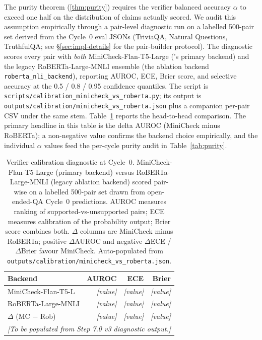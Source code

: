 The purity theorem (\cref{thm:purity}) requires the verifier balanced
accuracy $\alpha$ to exceed one half on the distribution of claims
actually scored. We audit this assumption empirically through a
pair-level diagnostic run on a labelled 500-pair set derived from the
Cycle~0 eval JSONs (TriviaQA, Natural Questions, TruthfulQA; see
\S\ref{sec:impl-details} for the pair-builder protocol). The
diagnostic scores every pair with \emph{both} MiniCheck-Flan-T5-Large
(\caem{}'s primary backend) and the legacy RoBERTa-Large-MNLI
ensemble (the ablation backend \texttt{roberta\_nli\_backend}),
reporting AUROC, ECE, Brier score, and selective accuracy at the 0.5
/ 0.8 / 0.95 confidence quantiles. The script is
\texttt{scripts/calibration\_minicheck\_vs\_roberta.py}; its output is
\texttt{outputs/calibration/minicheck\_vs\_roberta.json} plus a
companion per-pair CSV under the same stem.
Table~\ref{tab:verifier-calibration} reports the head-to-head
comparison. The primary headline in this table is the delta AUROC
(MiniCheck minus RoBERTa); a non-negative value confirms the backend
choice empirically, and the individual $\alpha$ values feed the
per-cycle purity audit in Table~\ref{tab:purity}.

\begin{table}[t]
\centering
\caption{Verifier calibration diagnostic at Cycle~0. MiniCheck-Flan-T5-Large
(primary backend) versus RoBERTa-Large-MNLI (legacy ablation backend)
scored pair-wise on a labelled 500-pair set drawn from open-ended-QA
Cycle~0 predictions. AUROC measures ranking of supported-vs-unsupported
pairs; ECE measures calibration of the probability output; Brier score
combines both. $\Delta$ columns are MiniCheck minus RoBERTa; positive
$\Delta$AUROC and negative $\Delta$ECE / $\Delta$Brier favour MiniCheck.
Auto-populated from \texttt{outputs/calibration/minicheck\_vs\_roberta.json}.}
\label{tab:verifier-calibration}
\begin{tabular}{lrrr}
\toprule
Backend & AUROC & ECE & Brier \\
\midrule
MiniCheck-Flan-T5-L & \emph{[value]} & \emph{[value]} & \emph{[value]} \\
RoBERTa-Large-MNLI  & \emph{[value]} & \emph{[value]} & \emph{[value]} \\
$\Delta$ (MC $-$ Rob) & \emph{[value]} & \emph{[value]} & \emph{[value]} \\
\midrule
\multicolumn{4}{c}{\emph{[To be populated from Step 7.0 v3 diagnostic output.]}}\\
\bottomrule
\end{tabular}
\end{table}

